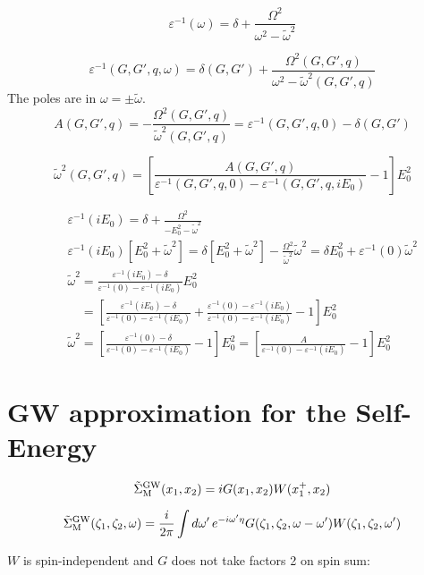 \documentclass[fleqn]{article}
\begin{document}
\[
  \varepsilon^{-1}(\omega) = 
  \delta + \frac{\Omega^2}{\omega^2 - \tilde{\omega}^2}
\]

\[
  \varepsilon^{-1}(G,G',q,\omega) = 
  \delta(G,G') + \frac{\Omega^2(G,G',q)}{\omega^2 - \tilde{\omega}^2(G,G',q)}
\]
The poles are in $\omega = \pm \tilde{\omega}$.
\[
  A(G,G',q) = - \frac{\Omega^2(G,G',q)}{\tilde{\omega}^2(G,G',q)} =
  \varepsilon^{-1}(G,G',q,0) - \delta(G,G')
\]

\[
  \tilde{\omega}^2(G,G',q) = 
  \left[ \frac{A(G,G',q)}{\varepsilon^{-1}(G,G',q,0) - \varepsilon^{-1}(G,G',q,iE_0)} - 1 \right] E_0^2
\]

\begin{eqnarray*}
  &&
  \varepsilon^{-1}(iE_0) = \delta + \frac{\Omega^2}{-E_0^2 - \tilde{\omega}^2}
  \\ &&
 \varepsilon^{-1}(iE_0) [E_0^2 + \tilde{\omega}^2] = 
  \delta [E_0^2 + \tilde{\omega}^2] - \frac{\Omega^2}{\tilde{\omega}^2} \tilde{\omega}^2 =
  \delta E_0^2 + \varepsilon^{-1}(0) \tilde{\omega}^2
  \\ &&
  \tilde{\omega}^2 = 
  \frac{\varepsilon^{-1}(iE_0) - \delta}{\varepsilon^{-1}(0) - \varepsilon^{-1}(iE_0)} E_0^2
  \\ && \phantom{\tilde{\omega}^2} =
  \left[ \frac{\varepsilon^{-1}(iE_0) - \delta}{\varepsilon^{-1}(0) - \varepsilon^{-1}(iE_0)} +
  \frac{\varepsilon^{-1}(0) - \varepsilon^{-1}(iE_0)}{\varepsilon^{-1}(0) - \varepsilon^{-1}(iE_0)}
  -1 \right] E_0^2
  \\ &&
  \tilde{\omega}^2 = 
  \left[ \frac{\varepsilon^{-1}(0) - \delta}{\varepsilon^{-1}(0) - \varepsilon^{-1}(iE_0)} - 1 \right] E_0^2
  = \left[ \frac{A}{\varepsilon^{-1}(0) - \varepsilon^{-1}(iE_0)} - 1 \right] E_0^2
\end{eqnarray*}

\newpage

\section{GW approximation for the Self-Energy}

\[
  \tilde{\Sigma}^{\rm GW}_{\rm M}(x_1,x_2) = i G(x_1,x_2) W(x_1^+,x_2)
\]

\[
  \tilde{\Sigma}^{\rm GW}_{\rm M}(\zeta_1,\zeta_2,\omega) =
  \frac{i}{2 \pi} \int d\omega' \, e^{-i \omega' \eta} 
  G(\zeta_1,\zeta_2,\omega-\omega')
  W(\zeta_1,\zeta_2,\omega')
\]

$W$ is spin-independent and $G$ does not take factors 2 on spin sum:
\end{document}

